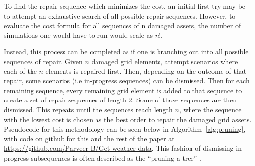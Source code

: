\documentclass[12pt]{article}
\begin{document}
To find the repair sequence which minimizes the cost, an initial first try may be to attempt an exhaustive search of all possible repair sequences. However, to evaluate the cost formula for all sequences of n damaged assets, the number of simulations one would have to run would scale as $n!$. \par
Instead, this process can be completed as if one is branching out into all possible sequences of repair. Given $n$ damaged grid elements, attempt scenarios where each of the $n$ elements is repaired first. Then, depending on the outcome of that repair, some scenarios (i.e in-progress sequences) can be dismissed. Then for each remaining sequence, every remaining grid element is added to that sequence to create a set of repair sequences of length 2. Some of those sequences are then dismissed. This repeats until the sequences reach length $n$, where the sequence with the lowest cost is chosen as the best order to repair the damaged grid assets. Pseudocode for this methodology can be seen below in Algorithm~\ref{alg:pruning}, with code on github for this and the rest of the paper at \url{https://github.com/Parveer-B/Get-weather-data}. This fashion of dismissing in-progress subsequences is often described as the “pruning a tree” \cite{morelato}.
\end{document}
